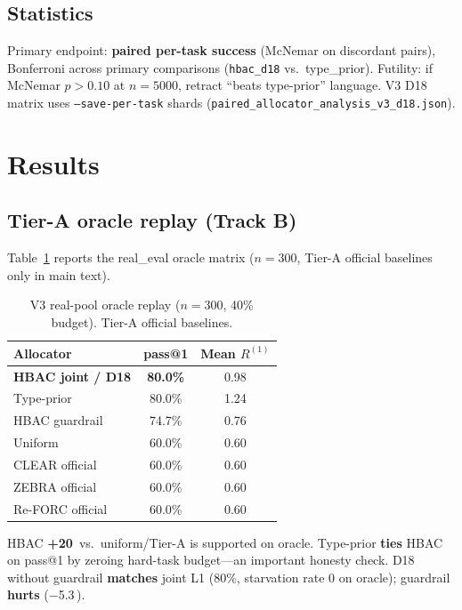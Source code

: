 \documentclass[11pt,letterpaper]{article}
\makeatletter
\newcommand{\passat}[1]{pass@#1}
\newcommand{\pp}{\,\text{pp}}
\makeatother
\begin{document}
\subsection{Statistics}

Primary endpoint: \textbf{paired per-task success} (McNemar on discordant pairs), Bonferroni across primary comparisons (\texttt{hbac\_d18} vs.\ type\_prior).
Futility: if McNemar $p > 0.10$ at $n{=}5000$, retract ``beats type-prior'' language.
V3 D18 matrix uses \texttt{--save-per-task} shards (\texttt{paired\_allocator\_analysis\_v3\_d18.json}).

\section{Results}
\label{sec:results}

\subsection{Tier-A oracle replay (Track B)}
\label{sec:oracle}

Table~\ref{tab:oracle-v3} reports the real\_eval oracle matrix ($n{=}300$, Tier-A official baselines only in main text).

\begin{table}[t]
\centering
\caption{V3 real-pool oracle replay ($n{=}300$, 40\% budget). Tier-A official baselines.}
\label{tab:oracle-v3}
\small
\begin{tabular}{lcc}
\toprule
Allocator & \passat{1} & Mean $R^{(1)}$ \\
\midrule
\textbf{HBAC joint / D18} & \textbf{80.0\%} & 0.98 \\
Type-prior & 80.0\% & 1.24 \\
HBAC guardrail & 74.7\% & 0.76 \\
Uniform & 60.0\% & 0.60 \\
CLEAR official & 60.0\% & 0.60 \\
ZEBRA official & 60.0\% & 0.60 \\
Re-FORC official & 60.0\% & 0.60 \\
\bottomrule
\end{tabular}
\end{table}

HBAC \textbf{+20\pp} vs.\ uniform/Tier-A is supported on oracle.
Type-prior \textbf{ties} HBAC on \passat{1} by zeroing hard-task budget---an important honesty check.
D18 without guardrail \textbf{matches} joint L1 (80\%, starvation rate 0 on oracle); guardrail \textbf{hurts} ($-$5.3\pp).
\end{document}
